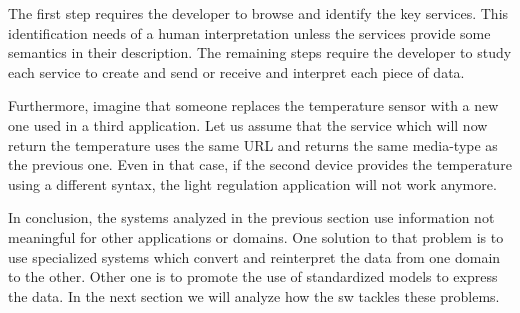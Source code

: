 
The first step requires the developer to browse and identify the key services.
This identification needs of a human interpretation unless the services provide some semantics in their description. %
The remaining steps require the developer to study each service to create and send or receive and interpret each piece of data.

Furthermore, imagine that someone replaces the temperature sensor with a new one used in a third application.
Let us assume that the service which will now return the temperature uses the same URL and returns the same media-type as the previous one.
Even in that case, if the second device provides the temperature using a different syntax, the light regulation application will not work anymore.

\medskip


In conclusion, the systems analyzed in the previous section use information not meaningful for other applications or domains.
One solution to that problem is to use specialized systems which convert and reinterpret the data from one domain to the other.
Other one is to promote the use of standardized models to express the data.
In the next section we will analyze how the \acl{sw} tackles these problems.